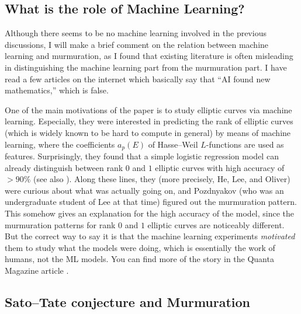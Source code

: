 \subsection{What is the role of Machine Learning?}

Although there seems to be no machine learning involved in the previous discussions, I will make a brief comment on the relation between machine learning and murmuration, as I found that existing literature is often misleading in distinguishing the machine learning part from the murmuration part.
I have read a few articles on the internet which basically say that ``AI found new mathematics,'' which is false.

One of the main motivations of the paper \cite{he2024murmurations} is to study elliptic curves via machine learning.
Especially, they were interested in predicting the rank of elliptic curves (which is widely known to be hard to compute in general) by means of machine learning, where the coefficients $a_p(E)$ of Hasse--Weil $L$-functions are used as features.
Surprisingly, they found that a simple logistic regression model can already distinguish between rank $0$ and $1$ elliptic curves with high accuracy of $>90\%$ (see also \cite{he2023machine}).
Along these lines, they (more precisely, He, Lee, and Oliver) were curious about what was actually going on, and Pozdnyakov (who was an undergraduate student of Lee at that time) figured out the murmuration pattern.
This somehow gives an explanation for the high accuracy of the model, since the murmuration patterns for rank $0$ and $1$ elliptic curves are noticeably different.
But the correct way to say it is that the machine learning experiments \emph{motivated} them to study what the models were doing, which is essentially the work of humans, not the ML models.
You can find more of the story in the Quanta Magazine article \cite{chiou2024elliptic}.


\subsection{Sato--Tate conjecture and Murmuration}


